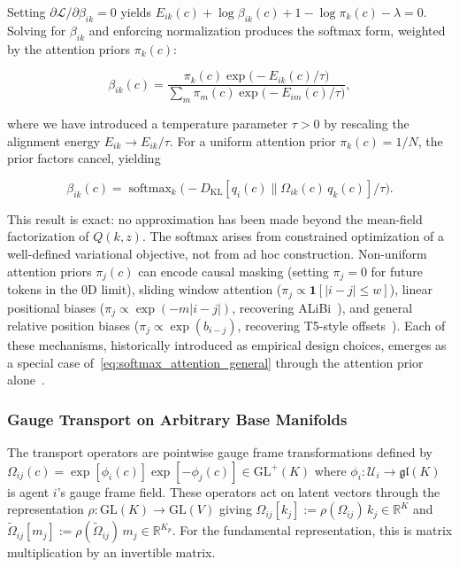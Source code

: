 \documentclass[11pt]{article}
\begin{document}
Setting $\partial \mathcal{L} / \partial \beta_{ik} = 0$ yields $E_{ik}(c) + \log \beta_{ik}(c) + 1 - \log \pi_k(c) - \lambda = 0$. Solving for $\beta_{ik}$ and enforcing normalization produces the softmax form, weighted by the attention priors $\pi_k(c)$:

\begin{equation}
\boxed{\beta_{ik}(c) = \frac{\pi_k(c) \exp\!\big(-E_{ik}(c)/\tau\big)}{\sum_m \pi_m(c) \exp\!\big(-E_{im}(c)/\tau\big)},}
\label{eq:softmax_attention_general}
\end{equation}

where we have introduced a temperature parameter $\tau > 0$ by rescaling the alignment energy $E_{ik} \to E_{ik}/\tau$. For a uniform attention prior $\pi_k(c) = 1/N$, the prior factors cancel, yielding

\begin{equation}
\beta_{ik}(c) = \operatorname{softmax}_k\!\big(-D_{\mathrm{KL}}[q_i(c) \| \Omega_{ik}(c)\,q_k(c)] / \tau\big).
\label{eq:softmax_attention_uniform}
\end{equation}

This result is exact: no approximation has been made beyond the mean-field factorization of $Q(k,z)$. The softmax arises from constrained optimization of a well-defined variational objective, not from ad hoc construction. Non-uniform attention priors $\pi_j(c)$ can encode causal masking (setting $\pi_j = 0$ for future tokens in the 0D limit), sliding window attention ($\pi_j \propto \mathbf{1}[|i-j| \leq w]$), linear positional biases ($\pi_j \propto \exp(-m|i-j|)$, recovering ALiBi~\cite{press2022train}), and general relative position biases ($\pi_j \propto \exp(b_{i-j})$, recovering T5-style offsets~\cite{raffel2020exploring}). Each of these mechanisms, historically introduced as empirical design choices, emerges as a special case of~\eqref{eq:softmax_attention_general} through the attention prior alone~\cite{Dennis2026GL}.

\subsubsection{Gauge Transport on Arbitrary Base Manifolds}
\label{sec:gauge_transport_arbitrary}

The transport operators are pointwise gauge frame transformations defined by $\Omega_{ij}(c) = \exp[\phi_i(c)] \exp[-\phi_j(c)] \in \mathrm{GL}^+(K)$ where $\phi_i: \mathcal{U}_i \to \mathfrak{gl}(K)$ is agent $i$'s gauge frame field. These operators act on latent vectors through the representation $\rho: \mathrm{GL}(K) \to \mathrm{GL}(V)$ giving $\Omega_{ij}[k_j] := \rho(\Omega_{ij}) \, k_j \in \mathbb{R}^{K}$ and $\tilde{\Omega}_{ij}[m_j] := \rho(\tilde{\Omega}_{ij}) \, m_j \in \mathbb{R}^{K_p}$. For the fundamental representation, this is matrix multiplication by an invertible matrix.
\end{document}
